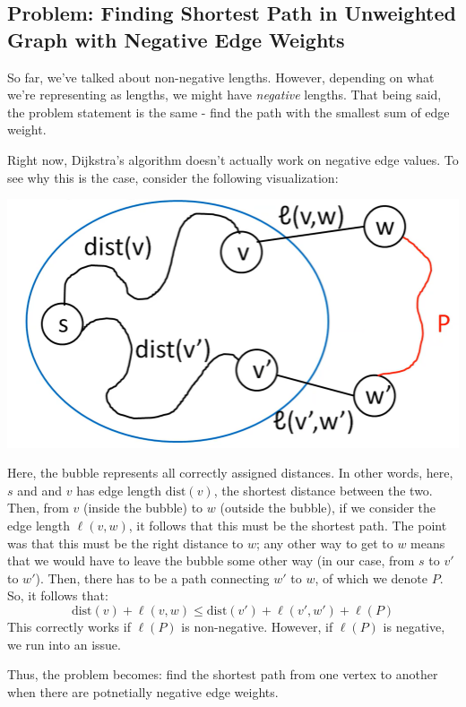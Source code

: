 \documentclass[letterpaper]{article}
\begin{document}
\subsection{Problem: Finding Shortest Path in Unweighted Graph with Negative Edge Weights}
So far, we've talked about non-negative lengths. However, depending on what we're representing as lengths, we might have \emph{negative} lengths. That being said, the problem statement is the same - find the path with the smallest sum of edge weight. 

\bigskip 

Right now, Dijkstra's algorithm doesn't actually work on negative edge values. To see why this is the case, consider the following visualization: 
\begin{center}
    \includegraphics[scale=0.3]{assets/neg_bubble.png}
\end{center}
Here, the bubble represents all correctly assigned distances. In other words, here, $s$ and and $v$ has edge length $\text{dist}(v)$, the shortest distance between the two. Then, from $v$ (inside the bubble) to $w$ (outside the bubble), if we consider the edge length $\ell(v, w)$, it follows that this must be the shortest path. The point was that this must be the right distance to $w$; any other way to get to $w$ means that we would have to leave the bubble some other way (in our case, from $s$ to $v'$ to $w'$). Then, there has to be a path connecting $w'$ to $w$, of which we denote $P$. So, it follows that:  
\[\text{dist}(v) + \ell(v, w) \leq \text{dist}(v') + \ell(v', w') + \ell(P)\]
This correctly works if $\ell(P)$ is non-negative. However, if $\ell(P)$ is negative, we run into an issue. 

\bigskip 

Thus, the problem becomes: find the shortest path from one vertex to another when there are potnetially negative edge weights. 
\end{document}
